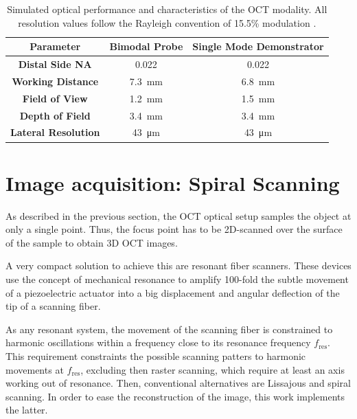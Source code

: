 \begin{table}[h!]\centering
	\begin{tabular}{ccc}\\
		\textbf{Parameter} & \textbf{Bimodal Probe} & \textbf{Single Mode Demonstrator} \\ 
		\hline
		\textbf{Distal Side NA} & 0.022 & 0.022 \\ 
		\textbf{Working Distance} & \SI{7.3}{\milli\meter} &  \SI{6.8}{\milli\meter} \\ 
		\textbf{Field of View} & \SI{1.2}{\milli\meter} &  \SI{1.5}{\milli\meter}\\ 
		\textbf{Depth of Field} & \SI{3.4}{\milli\meter}& \SI{3.4}{\milli\meter} \\ 
		\textbf{Lateral Resolution} & \SI{43}{\micro\meter} & \SI{43}{\micro\meter}\\ 
		\hline
	\end{tabular} 
    \caption{Simulated optical performance and characteristics of the OCT modality. All resolution values follow the Rayleigh convention of 15.5\% modulation \cite{Kretschmer}.}
    \label{tab:simRes}
\end{table}

\section{Image acquisition: Spiral Scanning}
\label{sec:spiralScanning}

As described in the previous section, the OCT optical setup samples the object at only a single point. Thus, the focus point has to be 2D-scanned over the surface of the sample to obtain 3D OCT images.

A very compact solution to achieve this are resonant fiber scanners. These devices use the concept of mechanical resonance to amplify 100-fold the subtle movement of a piezoelectric actuator into a big displacement and angular deflection of the tip of a scanning fiber. 

As any resonant system, the movement of the scanning fiber is constrained to harmonic oscillations within a frequency close to its resonance frequency $f_\mathrm{res}$. This requirement constraints the possible scanning patters to harmonic movements at $f_\mathrm{res}$, excluding then  raster scanning, which require at least an axis working out of resonance. Then, conventional alternatives are Lissajous \cite{Moon2010} and spiral scanning. In order to ease the reconstruction of the image, this work implements the latter.

